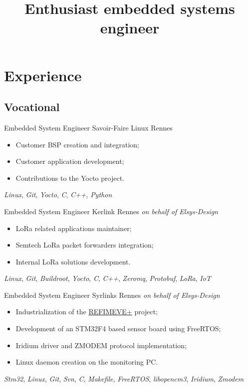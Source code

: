 \documentclass[11pt,a4paper,sans]{moderncv}
\title{Enthusiast embedded systems engineer}
\begin{document}
\makecvtitle

\section{Experience}
\subsection{Vocational}
	{Embedded System Engineer}
	{Savoir-Faire Linux}
	{Rennes}
	{}
	{
		\begin{itemize}
		\item Customer BSP creation and integration;
		\item Customer application development;
		\item Contributions to the Yocto project.
		\end{itemize}
		\textit{Linux},
		\textit{Git},
		\textit{Yocto},
		\textit{C}, \textit{C++}, \textit{Python}
	}
	{Embedded System Engineer}
	{Kerlink}
	{Rennes}
	{\textit{on behalf of Elsys-Design}}
	{
		\begin{itemize}
		\item LoRa related applications maintainer;
		\item Semtech LoRa packet forwarders integration;
		\item Internal LoRa solutions development.
		\end{itemize}
		\textit{Linux},
		\textit{Git},
		\textit{Buildroot}, \textit{Yocto},
		\textit{C}, \textit{C++},
		\textit{Zeromq}, \textit{Protobuf},
		\textit{LoRa}, \textit{IoT}
	}
	{Embedded System Engineer}
	{Syrlinks}
	{Rennes}
	{\textit{on behalf of Elsys-Design}}
	{
		\begin{itemize}
		\item Industrialization of the
			\href{http://www.refimeve.fr}{REFIMEVE+} project;
		\item Development of an STM32F4 based sensor board using FreeRTOS;
		\item Iridium driver and ZMODEM protocol implementation;
		\item Linux daemon creation on the monitoring PC.
		\end{itemize}
		\textit{Stm32},
		\textit{Linux},
		\textit{Git}, \textit{Svn},
		\textit{C}, \textit{Makefile},
		\textit{FreeRTOS}, \textit{libopencm3},
		\textit{Iridium}, \textit{Zmodem}
	}
\end{document}

